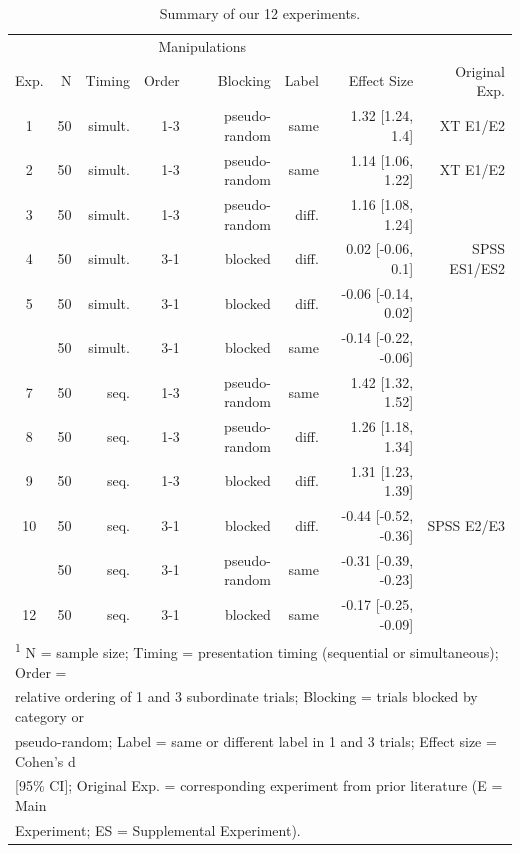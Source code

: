 \documentclass[english,floatsintext,man]{apa6}
\theoremstyle{definition}
\theoremstyle{definition}
\theoremstyle{remark}
\begin{document}
\begin{table}

\caption{\label{tab:unnamed-chunk-2}Summary of our 12 experiments.}
\centering
\fontsize{12}{14}\selectfont
\begin{tabular}[t]{crrrrrrr}
\toprule
\multicolumn{2}{c}{ } & \multicolumn{4}{c}{Manipulations} & \multicolumn{1}{c}{ } \\
\cmidrule(l{2pt}r{2pt}){3-6}
Exp. & N & Timing & Order & Blocking & Label & Effect Size & Original 
Exp.\\
\midrule
1 & 50 & simult. & 1-3 & pseudo-random & same & 1.32 [1.24, 1.4] & XT E1/E2\\
2 & 50 & simult. & 1-3 & pseudo-random & same & 1.14 [1.06, 1.22] & XT E1/E2\\
3 & 50 & simult. & 1-3 & pseudo-random & diff. & 1.16 [1.08, 1.24] & \\
4 & 50 & simult. & 3-1 & blocked & diff. & 0.02 [-0.06, 0.1] & SPSS ES1/ES2\\
5 & 50 & simult. & 3-1 & blocked & diff. & -0.06 [-0.14, 0.02] & \\
\addlinespace
6 & 50 & simult. & 3-1 & blocked & same & -0.14 [-0.22, -0.06] & \\
7 & 50 & seq. & 1-3 & pseudo-random & same & 1.42 [1.32, 1.52] & \\
8 & 50 & seq. & 1-3 & pseudo-random & diff. & 1.26 [1.18, 1.34] & \\
9 & 50 & seq. & 1-3 & blocked & diff. & 1.31 [1.23, 1.39] & \\
10 & 50 & seq. & 3-1 & blocked & diff. & -0.44 [-0.52, -0.36] & SPSS E2/E3\\
\addlinespace
11 & 50 & seq. & 3-1 & pseudo-random & same & -0.31 [-0.39, -0.23] & \\
12 & 50 & seq. & 3-1 & blocked & same & -0.17 [-0.25, -0.09] & \\
\bottomrule
\multicolumn{8}{l}{\textsuperscript{1} N = sample size; Timing = presentation timing (sequential or simultaneous); Order =}\\
\multicolumn{8}{l}{relative ordering of 1 and 3 subordinate trials; Blocking = trials blocked by category or}\\
\multicolumn{8}{l}{pseudo-random; Label = same or different label in 1 and 3 trials; Effect size = Cohen's d}\\
\multicolumn{8}{l}{[95\% CI]; Original Exp. = corresponding experiment from prior literature (E = Main}\\
\multicolumn{8}{l}{Experiment; ES = Supplemental Experiment).}\\
\end{tabular}
\end{table}
\end{document}
